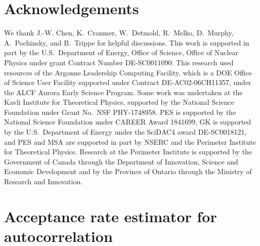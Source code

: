 
\section*{Acknowledgements}

We thank J.-W. Chen, K.~Cranmer, W.~Detmold, R.~Melko, D.~Murphy, A.~Pochinsky, and B.~Trippe for helpful discussions.
%
This work is supported in part by the U.S.~Department of Energy, Office of Science, Office of Nuclear Physics under grant Contract Number DE-SC0011090. This research used resources of the Argonne Leadership Computing Facility, which is a DOE Office of Science User Facility supported under Contract DE-AC02-06CH11357, under the ALCF Aurora Early Science Program. Some work was undertaken at the Kavli Institute for Theoretical Physics, supported by the National Science Foundation under Grant No.~NSF PHY-1748958.
PES is supported by the National Science Foundation under CAREER Award 1841699, GK is supported by the U.S.~Department of Energy under the SciDAC4 award DE-SC0018121, and PES and MSA are supported in part by NSERC and the Perimeter Institute for Theoretical Physics. Research at the Perimeter Institute is supported by the Government of Canada through the Department of Innovation, Science and Economic Development and by the Province of Ontario through the Ministry of Research and Innovation.


\appendix

\section{Acceptance rate estimator for autocorrelation}
\label{app:bounds}

